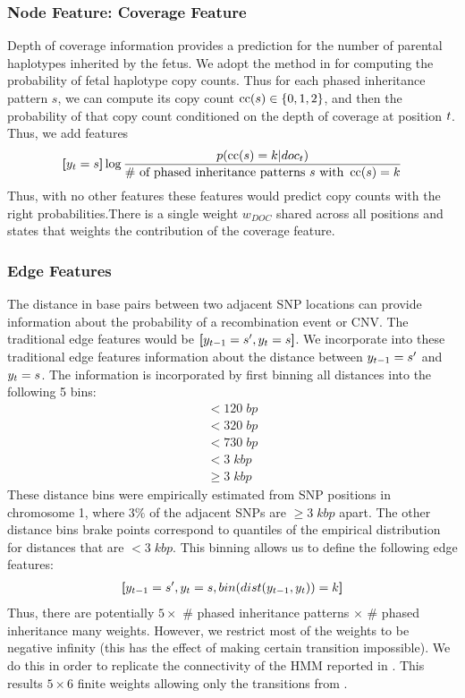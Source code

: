 \subsubsection{Node Feature: Coverage Feature}
Depth of coverage information provides a prediction for the number of parental haplotypes inherited by the fetus. We adopt the method in \citet{rampasek2014fcnv}  for computing the probability of fetal haplotype copy counts. Thus for each phased inheritance pattern $s$, we can compute its copy count $\operatorname*{cc}(s) \in \{0, 1, 2\}$, and then the probability of that copy count conditioned on the depth of coverage at position $t$. Thus, we add features
\begin{align*}
\bm{[}y_{t} = s\bm{]}\log \frac{p(\operatorname*{cc}(s) = k | doc_{t})}{\text{\# of phased inheritance patterns $s$ with } \operatorname*{cc}(s) = k}
\end{align*}
Thus, with no other features these features would predict copy counts with the right probabilities.There is a single weight $w_{DOC}$ shared across all positions and states that weights the contribution of the coverage feature.

\subsubsection{Edge Features}
The distance in base pairs between two adjacent SNP locations can provide information about the probability of a recombination event or CNV. The traditional edge features would be $\bm{[}y_{t-1} = s^{\prime} , y_{t} = s\bm{]}$. We incorporate into these traditional edge features information about the distance between $y_{t-1} = s^{\prime}$ and $y_{t} = s$. The information is incorporated by first binning all distances into the following 5 bins: 
\begin{align*}
< 120 \; bp\\
< 320 \; bp\\
< 730 \; bp\\
< 3 \; kbp\\
\geq 3 \; kbp
\end{align*}
These distance bins were empirically estimated from SNP positions in chromosome 1, where $3\%$ of the adjacent SNPs are $\geq 3\;kbp$ apart. The other distance bins brake points correspond to quantiles of the empirical distribution for distances that are $< 3\;kbp$.
This binning allows us to define the following edge features:
\begin{align*}
\bm{[}y_{t-1} = s^{\prime} , y_{t} = s, bin(dist(y_{t-1} , y_{t} )) = k\bm{]}
\end{align*}
Thus, there are potentially $5 \times $ \# phased inheritance patterns $\times $ \# phased inheritance many weights. However, we restrict most of the weights to be negative infinity (this has the effect of making certain transition impossible). We do this in order to replicate the connectivity of the HMM reported in \citet{rampasek2014fcnv}. This results $5 \times 6$ finite weights allowing only the transitions from \citet{rampasek2014fcnv}.

